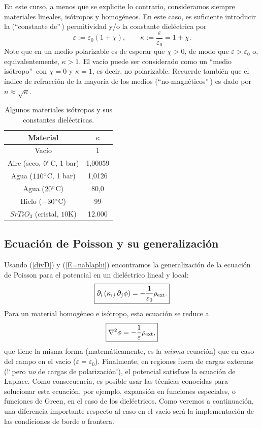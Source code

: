 En este curso, a menos que se explicite lo contrario, consideramos siempre
materiales lineales, isótropos y homogéneos. En este caso, es suficiente
introducir la (``constante de''\,) permitividad y/o la constante dieléctrica
por
\begin{equation}
\varepsilon:=\varepsilon_0(1+\chi), \qquad
\kappa:=\frac{\varepsilon}{\varepsilon_0}=1+\chi.
\end{equation}
Note que en un medio polarizable es de esperar que $\chi>0$, de modo que
$\varepsilon>\varepsilon_0$ o, equivalentemente, $\kappa>1$. El vacío puede ser
considerado como un ``medio isótropo''\, con $\chi=0$ y $\kappa=1$, es decir, no polarizable.
Recuerde también que el índice de refracción de la mayoría de los medios
(``no-magnéticos''\,) es dado por $n\approx\sqrt{\kappa}$.
\begin{table}[!h]
\begin{center}
\begin{tabular}{c|c}
Material &   $\kappa$ \\ \hline\hline
Vacío & 1 \\
Aire (seco, $0^{\rm o}$C, 1 bar)  & 1,00059 \\
Agua ($110^{\rm o}$C, 1 bar)  & 1,0126 \\
Agua ($20^{\rm o}$C) &  80,0 \\
Hielo ($-30^{\rm o}$C) &  99 \\
$SrTiO_3$ (cristal, $10$K)  & 12.000 \\
\end{tabular}
\caption{Algunos materiales isótropos y sus constantes dieléctricas.}
\end{center}
\end{table}

\subsection{Ecuación de Poisson y su generalización}

Usando (\ref{divD}) y (\ref{E=nablaphi}) encontramos la generalización de la
ecuación de Poisson para el potencial en un dieléctrico lineal y local:
\begin{equation}
 \boxed{\partial_i\left(\kappa_{ij}\,\partial_j \phi\right)
=-\frac{1}{\varepsilon_0}\rho_{\rm ext}.}
\end{equation}
Para un material homogéneo e isótropo, esta ecuación se reduce a
\begin{equation}\label{Poissond}
 \boxed{\nabla^2\phi=-\frac{1}{\varepsilon}\rho_{\rm ext},}
\end{equation}
que tiene la misma forma (matemáticamente, es la \textit{misma} ecuación) que
en caso del campo en el vacío ($\varepsilon=\varepsilon_0$). Finalmente, en
regiones fuera de cargas externas (!`\,pero \textit{no} de cargas de
polarización!), el potencial satisface la ecuación de Laplace. Como
consecuencia, es posible usar las técnicas conocidas para solucionar esta ecuación, por ejemplo, expansión en funciones especiales, o funciones de Green, en el caso de los dieléctricos.
Como veremos a continuación, una diferencia importante respecto al caso en el
vacío será la implementación de las condiciones de borde o frontera.


